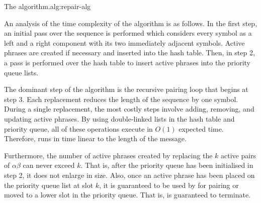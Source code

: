 {\begin{minipage}{13cm}
\end{minipage}
}{The \repair algorithm.}{\repair}{alg:repair-alg}


An analysis of the time complexity of the algorithm 
is as follows.  In the first step, an initial pass over the
sequence is performed which considers every symbol as a left
and a right component with its two immediately adjacent 
symbols.  Active phrases are created if necessary and inserted
into the hash table.  Then, in step 2, a pass is performed
over the hash table to insert active phrases into the priority
queue lists.

The dominant step of the algorithm is the recursive pairing loop 
that begins at step 3.  Each replacement reduces the length of 
the sequence by one symbol.  During a single replacement, the
most costly steps involve adding, removing, and updating active 
phrases.  By using double-linked lists in the hash table and 
priority queue, all of these operations 
execute in $O(1)$ expected time.  Therefore, \repair runs in time
linear to the length of the message.

Furthermore, the number of active 
phrases created by replacing the $k$ active pairs of 
${\alpha}{\beta}$ can never exceed $k$.  That is, after the
priority queue has been initialised in step 2, it does not 
enlarge in size.  Also, once an active phrase has been placed
on the priority queue list at slot $k$, it is guaranteed to
be used by \repair for pairing or moved to a lower slot in the
priority queue.  That is, \repair is guaranteed to terminate.

